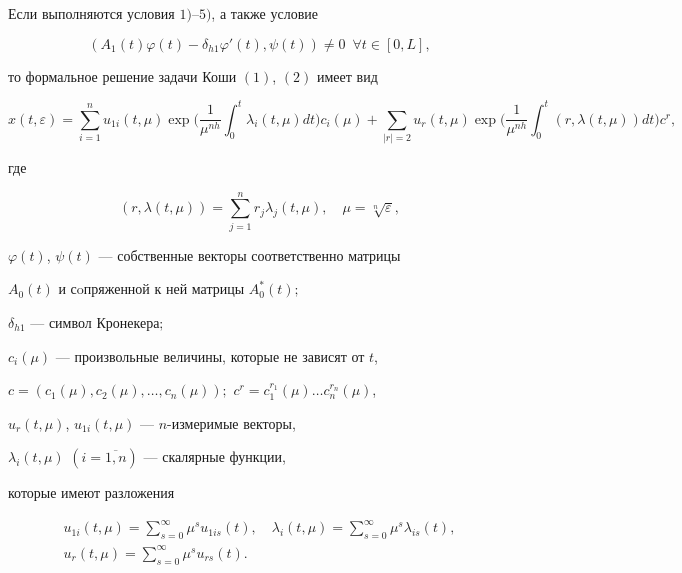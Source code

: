 \begin{thm}


Если выполняются условия $1)$--$5)$, а также условие


\begin{equation}


(A_{1}(t)\varphi(t)-\delta_{h1}\varphi'(t),\psi(t))\neq 0\ \;\forall t\in [0,L],


\end{equation}


то формальное решение задачи Коши $(1)$, $(2)$ имеет вид


\begin{equation}


x(t,\varepsilon)=\sum_{i=1}^{n}u_{1i}(t,\mu)


\exp\bigg(\frac{1}{\mu^{nh}}


\int_{0}^{t}\lambda_{i}(t,\mu)dt\bigg)c_{i}(\mu)+\sum_{|r|=2}


u_{r} (t,\mu)\exp\bigg(\frac{1}{\mu^{nh}}


\int_{0}^{t}(r,\lambda(t,\mu))dt\bigg)c^{r},


\end{equation}


где


$$


(r,\lambda(t,\mu))=\sum_{j=1}^{n}r_{j}\lambda_{j}(t,\mu),


\quad \mu=\sqrt[n]{\varepsilon},


$$


$\varphi(t)$, $\psi(t)$ --- собственные векторы соответственно матрицы


$A_{0}(t)$ и сoпряженной к ней матрицы $A^{\ast}_{0}(t);$


$\delta_{h1}$ --- символ Кронекера\/$;$


$c_{i}(\mu)$ --- произвольные величины, которые не зависят от $t$,


$c=(c_{1}(\mu),c_{2}(\mu),\dotsc,


c_{n}(\mu));$ $c^{r}=c_{1}^{r_1}(\mu)\dotsc c_{n}^{r_n}(\mu)$,


$u_{r}(t,\mu)$, $u_{1i}(t,\mu)$ --- $n$-измеримые векторы,


$\lambda_{i}(t,\mu)$ $(i=\overline{1,n})$ --- скалярные функции,


которые имеют разложения


\begin{gather}


u_{1i}(t,\mu)=\sum_{s=0}^{\infty}\mu^{s}u_{1is}(t),\quad


\lambda_{i}(t,\mu)=\sum_{s=0}^{\infty}\mu^{s}\lambda_{is}(t),\\


%


u_{r}(t,\mu)=\sum_{s=0}^{\infty}\mu^{s}u_{rs} (t).


\end{gather}


\end{thm}








